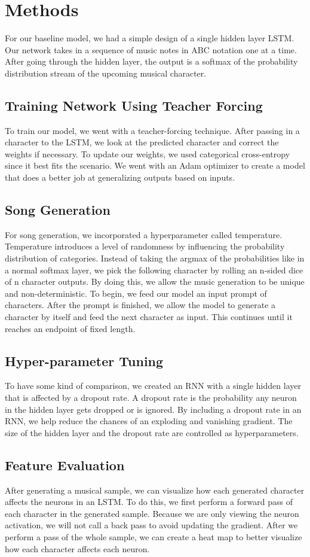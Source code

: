 \section*{Methods}
For our baseline model, we had a simple design of a single hidden layer LSTM. Our network takes in a sequence of music notes in ABC notation one at a time. After going through the hidden layer, the output is a softmax of the probability distribution stream of the upcoming musical character. 

\subsection*{Training Network Using Teacher Forcing}
To train our model, we went with a teacher-forcing technique. After passing in a character to the LSTM, we look at the predicted character and correct the weights if necessary. To update our weights, we used categorical cross-entropy since it best fits the scenario. We went with an Adam optimizer to create a model that does a better job at generalizing outputs based on inputs.

\subsection*{Song Generation}
For song generation, we incorporated a hyperparameter called temperature. Temperature introduces a level of randomness by influencing the probability distribution of categories. Instead of taking the argmax of the probabilities like in a normal softmax layer, we pick the following character by rolling an n-sided dice of n character outputs. By doing this, we allow the music generation to be unique and non-deterministic. To begin, we feed our model an input prompt of characters. After the prompt is finished, we allow the model to generate a character by itself and feed the next character as input. This continues until it reaches an endpoint of fixed length.

\subsection*{Hyper-parameter Tuning}
To have some kind of comparison, we created an RNN with a single hidden layer that is affected by a dropout rate. A dropout rate is the probability any neuron in the hidden layer gets dropped or is ignored. By including a dropout rate in an RNN, we help reduce the chances of an exploding and vanishing gradient. The size of the hidden layer and the dropout rate are controlled as hyperparameters.

\subsection*{Feature Evaluation}
After generating a musical sample, we can visualize how each generated character affects the neurons in an LSTM. To do this, we first perform a forward pass of each character in the generated sample. Because we are only viewing the neuron activation, we will not call a back pass to avoid updating the gradient. After we perform a pass of the whole sample, we can create a heat map to better visualize how each character affects each neuron.